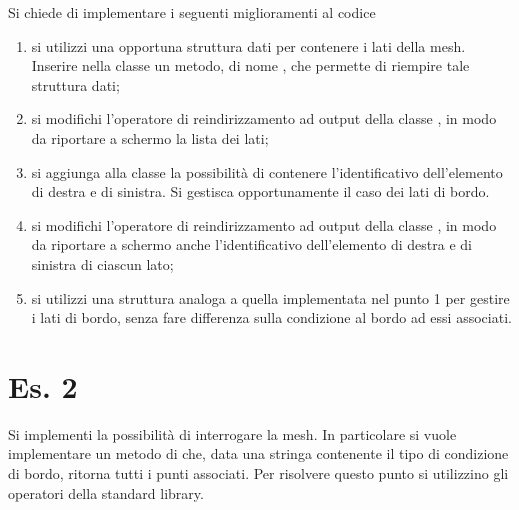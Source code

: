 Si chiede di implementare i seguenti miglioramenti al codice
\begin{enumerate}
	\item si utilizzi una opportuna struttura dati per contenere i lati della mesh. Inserire
	nella classe  un metodo, di nome , che permette di riempire
	tale struttura dati;
	\item si modifichi l'operatore di reindirizzamento ad output della classe , 
	in modo da riportare a schermo la lista dei lati;
	\item si aggiunga alla classe  la possibilit\`a di contenere l'identificativo
	dell'elemento di destra e di sinistra. Si gestisca opportunamente il caso dei lati di bordo.
	\item si modifichi l'operatore di reindirizzamento ad output della classe , 
	in modo da riportare a schermo anche l'identificativo dell'elemento di destra e di sinistra
	di ciascun lato;
	\item si utilizzi una struttura analoga a quella implementata nel punto 1 per gestire i lati 
	di bordo, senza fare differenza sulla condizione al bordo ad essi associati.
\end{enumerate}

\section*{Es. 2}

Si implementi la possibilit\`a di interrogare la mesh. In particolare si vuole implementare un 
metodo di  che, data una stringa contenente il tipo di condizione di bordo, ritorna
tutti i punti associati. Per risolvere questo punto si utilizzino gli operatori della standard
library.


